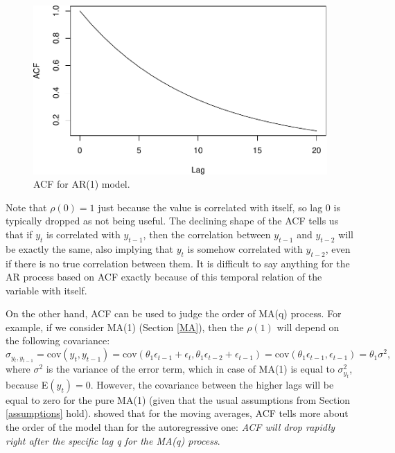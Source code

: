 \documentclass[
]{book}
\theoremstyle{definition}
\theoremstyle{definition}
\theoremstyle{definition}
\theoremstyle{definition}
\theoremstyle{remark}
\begin{document}
\begin{figure}
\centering
\includegraphics{Svetunkov--2022----ADAM_files/figure-latex/ACFExampleAR1-1.pdf}
\caption{\label{fig:ACFExampleAR1}ACF for AR(1) model.}
\end{figure}

Note that \(\rho(0)=1\) just because the value is correlated with itself, so lag 0 is typically dropped as not being useful. The declining shape of the ACF tells us that if \(y_t\) is correlated with \(y_{t-1}\), then the correlation between \(y_{t-1}\) and \(y_{t-2}\) will be exactly the same, also implying that \(y_{t}\) is somehow correlated with \(y_{t-2}\), even if there is no true correlation between them. It is difficult to say anything for the AR process based on ACF exactly because of this temporal relation of the variable with itself.

On the other hand, ACF can be used to judge the order of MA(q) process. For example, if we consider MA(1) (Section \ref{MA}), then the \(\rho(1)\) will depend on the following covariance:
\begin{equation}
  \sigma_{y_t,y_{t-1}} = \mathrm{cov}(y_t,y_{t-1}) = \mathrm{cov}(\theta_1 \epsilon_{t-1} + \epsilon_t, \theta_1 \epsilon_{t-2} + \epsilon_{t-1}) = \mathrm{cov}(\theta_1 \epsilon_{t-1}, \epsilon_{t-1}) = \theta_1 \sigma^2 ,
  \label{eq:autoCovarianceMA1}
\end{equation}
where \(\sigma^2\) is the variance of the error term, which in case of MA(1) is equal to \(\sigma^2_{y_t}\), because E\((y_t)=0\). However, the covariance between the higher lags will be equal to zero for the pure MA(1) (given that the usual assumptions from Section \ref{assumptions} hold). \citet{Box1976} showed that for the moving averages, ACF tells more about the order of the model than for the autoregressive one: \emph{ACF will drop rapidly right after the specific lag q for the MA(q) process}.
\end{document}
